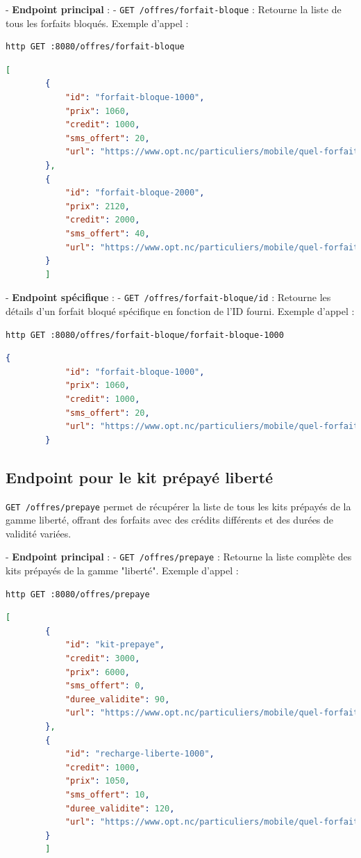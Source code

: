 \documentclass{article}
\begin{document}
	- \textbf{Endpoint principal} :
	- \texttt{GET /offres/forfait-bloque} : Retourne la liste de tous les forfaits bloqués.
	Exemple d'appel :
	\begin{lstlisting}[language=bash]
		http GET :8080/offres/forfait-bloque
	\end{lstlisting}
	\begin{lstlisting}[language=JSON]
		[
		{
			"id": "forfait-bloque-1000",
			"prix": 1060,
			"credit": 1000,
			"sms_offert": 20,
			"url": "https://www.opt.nc/particuliers/mobile/quel-forfait-choisir/forfait-bloque-1000"
		},
		{
			"id": "forfait-bloque-2000",
			"prix": 2120,
			"credit": 2000,
			"sms_offert": 40,
			"url": "https://www.opt.nc/particuliers/mobile/quel-forfait-choisir/forfait-bloque-2000"
		}
		]
	\end{lstlisting}
	
	- \textbf{Endpoint spécifique} :
	- \texttt{GET /offres/forfait-bloque/{id}} : Retourne les détails d'un forfait bloqué spécifique en fonction de l'ID fourni.
	Exemple d'appel :
	\begin{lstlisting}[language=bash]
		http GET :8080/offres/forfait-bloque/forfait-bloque-1000
	\end{lstlisting}
	\begin{lstlisting}[language=JSON]
		{
			"id": "forfait-bloque-1000",
			"prix": 1060,
			"credit": 1000,
			"sms_offert": 20,
			"url": "https://www.opt.nc/particuliers/mobile/quel-forfait-choisir/forfait-bloque-1000"
		}
	\end{lstlisting}
	
	\subsection{Endpoint pour le kit prépayé liberté}
	\texttt{GET /offres/prepaye} permet de récupérer la liste de tous les kits prépayés de la gamme liberté, offrant des forfaits avec des crédits différents et des durées de validité variées.
	
	- \textbf{Endpoint principal} :
	- \texttt{GET /offres/prepaye} : Retourne la liste complète des kits prépayés de la gamme "liberté".
	Exemple d'appel :
	\begin{lstlisting}[language=bash]
		http GET :8080/offres/prepaye
	\end{lstlisting}
	\begin{lstlisting}[language=JSON]
		[
		{
			"id": "kit-prepaye",
			"credit": 3000,
			"prix": 6000,
			"sms_offert": 0,
			"duree_validite": 90,
			"url": "https://www.opt.nc/particuliers/mobile/quel-forfait-choisir/kit-prepaye-liberte"
		},
		{
			"id": "recharge-liberte-1000",
			"credit": 1000,
			"prix": 1050,
			"sms_offert": 10,
			"duree_validite": 120,
			"url": "https://www.opt.nc/particuliers/mobile/quel-forfait-choisir/kit-prepaye-liberte"
		}
		]
	\end{lstlisting}
	
\end{document}
